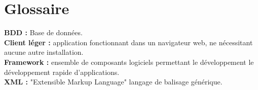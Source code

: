 \cleardoublepage

\chapter*{Glossaire}

\thispagestyle{empty}



\textbf{BDD :} Base de données.
\\

\textbf{Client léger :} application fonctionnant dans un navigateur web, ne nécessitant aucune autre installation.
\\

\textbf{Framework :} ensemble de composants logiciels permettant le développement le développement rapide d'applications.
\\

\textbf{XML :} "Extensible Markup Language" langage de balisage générique.